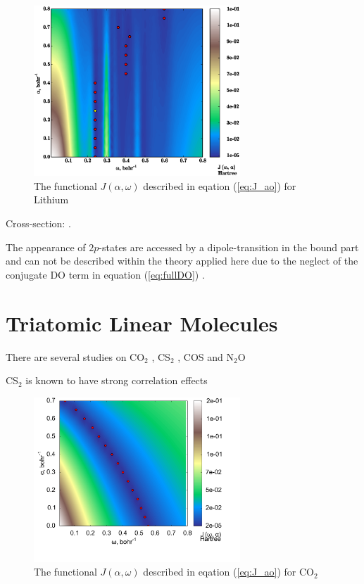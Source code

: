 \begin{figure}
\includegraphics[width=0.69\textwidth]{Figures/Lithium/Lithium_J0_2D_terrain_path_spline_cut}
\caption{The functional $J(\alpha,\omega)$ described in eqation (\ref{eq:J_ao}) for Lithium}
\label{fig:Lith-otrsh}
\end{figure}

Cross-section: \cite{LiCS}.

The appearance of $2p$-states are accessed by a dipole-transition in the bound part and can not be described within the theory applied here due to the neglect of the conjugate DO term in equation (\ref{eq:fullDO}) \cite{saPonzi}.

\section{Triatomic Linear Molecules}
There are several studies on CO$_2$ \cite{CO2, CO2_highres, HighResLinear, DiffLinear}, CS$_2$ \cite{DiffLinear,HighResLinear}, COS \cite{DiffLinear,HighResLinear} and N$_2$O \cite{DiffLinear}

CS$_2$ is known to have strong correlation effects \cite{2phcederbaum}
\begin{figure}
\includegraphics[width=0.69\textwidth]{Figures/CO2_J0_2D_terrain}
\caption{The functional $J(\alpha,\omega)$ described in eqation (\ref{eq:J_ao}) for CO$_2$}
\label{fig:CO2-otrsh}
\end{figure}

